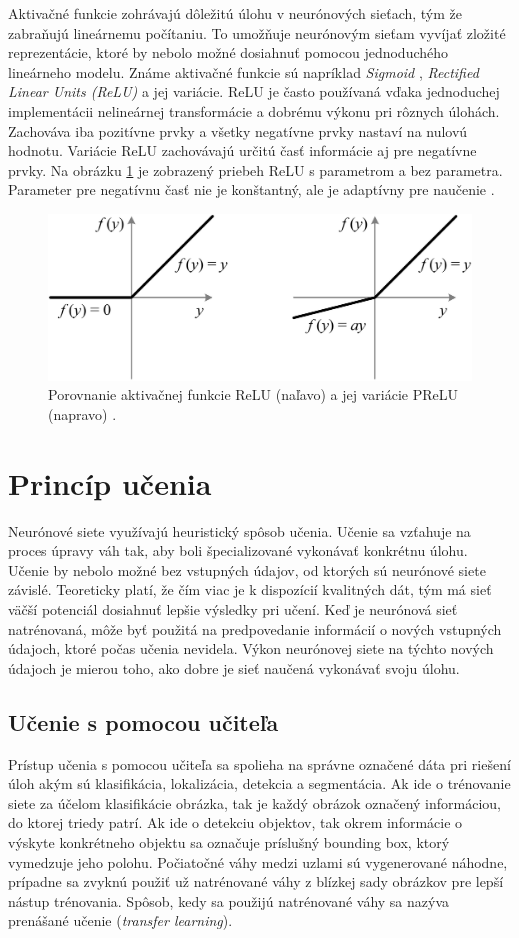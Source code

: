 Aktivačné funkcie zohrávajú dôležitú úlohu v neurónových sieťach, tým že zabraňujú lineárnemu počítaniu. To umožňuje neurónovým sieťam vyvíjať zložité reprezentácie, ktoré by nebolo možné dosiahnuť pomocou jednoduchého lineárneho modelu. Známe aktivačné funkcie sú napríklad \textit{Sigmoid} \cite{sigmoid}, \textit{Rectified Linear Units (ReLU)} \cite{relu} a jej variácie. ReLU je často používaná vďaka jednoduchej implementácii nelineárnej transformácie a dobrému výkonu pri rôznych úlohách. Zachováva iba pozitívne prvky a všetky negatívne prvky nastaví na nulovú hodnotu. Variácie ReLU zachovávajú určitú časť informácie aj pre negatívne prvky. Na obrázku \ref{img:rr} je zobrazený priebeh ReLU s parametrom a bez parametra. Parameter pre negatívnu časť nie je konštantný, ale je adaptívny pre naučenie \cite{prelu}.
\\
\begin{figure}[ht]
    \centering
    \includegraphics[width=.6\textwidth]{images/02/relu_prelu.png}
    \caption{Porovnanie aktivačnej funkcie ReLU (naľavo) a jej variácie PReLU (napravo) \cite{prelu}.}
    \label{img:rr}
\end{figure}

\section{Princíp učenia}

Neurónové siete využívajú heuristický spôsob učenia. Učenie sa vzťahuje na proces úpravy váh tak, aby boli špecializované vykonávať konkrétnu úlohu. Učenie by nebolo možné bez vstupných údajov, od ktorých sú neurónové siete závislé. Teoreticky platí, že čím viac je k dispozícií kvalitných dát, tým má sieť väčší potenciál dosiahnuť lepšie výsledky pri učení. Keď je neurónová sieť natrénovaná, môže byť použitá na predpovedanie informácií o nových vstupných údajoch, ktoré počas učenia nevidela. Výkon neurónovej siete na týchto nových údajoch je mierou toho, ako dobre je sieť naučená vykonávať svoju úlohu.

\subsection{Učenie s pomocou učiteľa}
Prístup učenia s pomocou učiteľa sa spolieha na správne označené dáta pri riešení úloh akým sú klasifikácia, lokalizácia, detekcia a segmentácia. Ak ide o trénovanie siete za účelom klasifikácie obrázka, tak je každý obrázok označený informáciou, do ktorej triedy patrí. Ak ide o detekciu objektov, tak okrem informácie o výskyte konkrétneho objektu sa označuje príslušný bounding box, ktorý vymedzuje jeho polohu. Počiatočné váhy medzi uzlami sú vygenerované náhodne, prípadne sa zvyknú použiť už natrénované váhy z blízkej sady obrázkov pre lepší nástup trénovania. Spôsob, kedy sa použijú natrénované váhy sa nazýva prenášané učenie (\textit{transfer learning}). 


